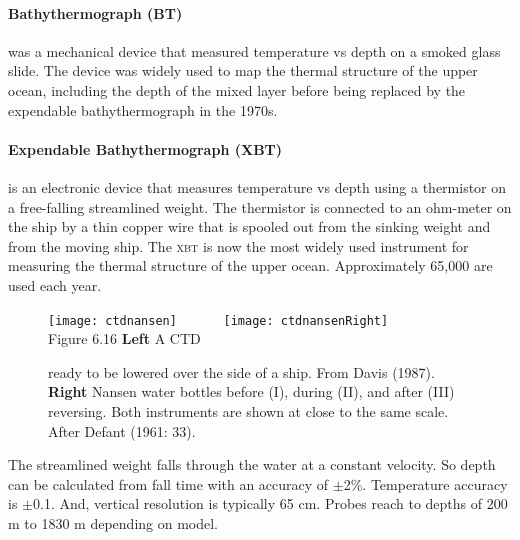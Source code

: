 \paragraph{Bathythermograph (BT)} was a mechanical device that measured
temperature vs depth on a smoked glass
slide. The device was widely used to map the thermal structure of the
upper ocean, including the depth of the mixed layer before being replaced by the
expendable bathythermograph in the 1970s.

\paragraph{Expendable Bathythermograph (XBT)} is an electronic device that
measures temperature vs depth using a thermistor on a
free-falling streamlined weight. The thermistor is connected to an
ohm-meter on the ship by a thin copper wire that is spooled out from
the sinking weight and from the moving ship. The \textsc{xbt} is now
the most widely used instrument for measuring the thermal structure of
the upper ocean. Approximately 65,000 are used each year.

\begin{figure}[t!]
\texttt{[image: ctdnansen]}
\ \ \ \ \ \
\texttt{[image: ctdnansenRight]}
\ \ \ \ \ \ \\
\footnotesize
Figure 6.16 \textbf{Left} A CTD \rule{0mm}{4ex}ready to be
lowered over the side of a ship. From Davis (1987). \textbf{Right}
Nansen water bottles before (I), during (II), and after (III)
reversing. Both instruments are shown at close to the same
scale. After Defant (1961: 33).
\label{fig:ctdnansen}
\vspace{-3ex}
\end{figure}

The streamlined weight falls through the water at a constant
velocity. So depth can be calculated from fall time with an
accuracy of $\pm$2\%.  Temperature
accuracy\index{accuracy!temperature!XBT} is $\pm$0.1\degrees{C}.  And,
vertical resolution is typically 65 cm. Probes reach to depths of 200
m to 1830 m depending on model.

